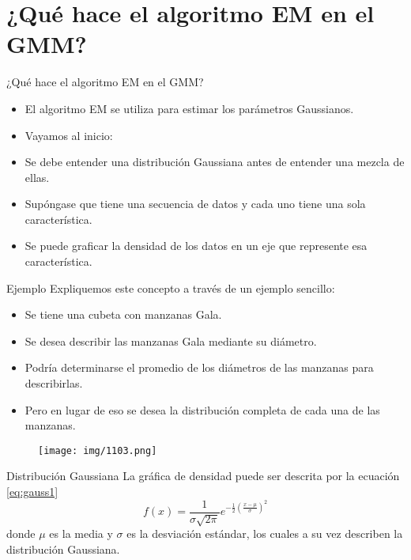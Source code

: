 \documentclass[11pt,aspectratio=169]{beamer}
\begin{document}
\section{¿Qué hace el algoritmo EM en el GMM?}
\begin{frame}{¿Qué hace el algoritmo EM en el GMM?}
\begin{itemize}
	\item El algoritmo EM se utiliza para estimar los parámetros Gaussianos.\pause
	\item Vayamos al inicio:\pause
	\item Se debe entender una distribución Gaussiana antes de entender una mezcla de ellas.\pause
	\item Supóngase que tiene una secuencia de datos y cada uno tiene una sola característica.\pause
	\item Se puede graficar la densidad de los datos en un eje que represente esa característica.
\end{itemize}
\end{frame}

\begin{frame}{Ejemplo}
\pause Expliquemos este concepto a través de un ejemplo sencillo:\pause
\begin{itemize}
	\item Se tiene una cubeta con manzanas Gala.\pause
	\item Se desea describir las manzanas Gala mediante su diámetro.\pause
	\item Podría determinarse el promedio de los diámetros de las manzanas para describirlas.\pause
	\item Pero en lugar de eso se desea la distribución completa de cada una de las manzanas. \pause
\end{itemize}
\begin{figure}[H]
	\centering
	\texttt{[image: img/1103.png]}
\end{figure}
\end{frame}

\begin{frame}{Distribución Gaussiana}
La gráfica de densidad puede ser descrita por la ecuación \ref{eq:gauss1}
\begin{equation}
	f(x) = \dfrac{1}{\sigma\sqrt{2\pi}}e^{-\frac{1}{2}\left(\frac{x-\mu}{\sigma}\right)^2}
	\label{eq:gauss1}
\end{equation}
donde $\mu$ es la media y $\sigma$ es la desviación estándar, los cuales a su vez describen la distribución Gaussiana.
\end{frame}
\end{document}
